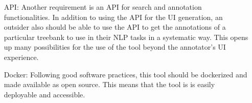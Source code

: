 \begin{itemize}[before=\normalfont, font=\itshape, align=left]
\item[API:]
Another requirement is an API for search and annotation functionalities.
In addition to using the API for the UI generation, an outsider also should be able to use the API to get the annotations of a particular treebank to use in their NLP tasks in a systematic way.
This opens up many possibilities for the use of the tool beyond the annotator's UI experience.

\item[Docker:]
Following good software practices, this tool should be dockerized and made available as open source.
This means that the tool is is easily deployable and accessible.
\end{itemize}
